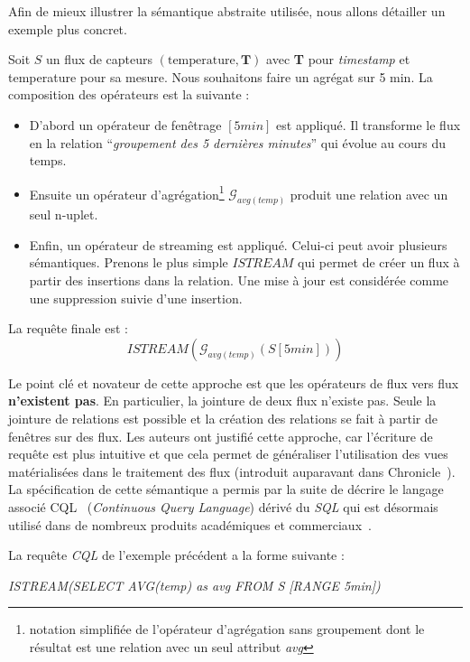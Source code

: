 Afin de mieux illustrer la sémantique abstraite utilisée, nous allons détailler un exemple plus concret.
\begin{example}
Soit $S$ un flux de capteurs $(\mathrm{temperature}, \textbf{T})$ avec \textbf{T} pour \textit{timestamp} et temperature pour sa mesure. Nous souhaitons faire un agrégat sur 5 min. La composition des opérateurs est la suivante :
\begin{itemize}
\item D'abord un opérateur de fenêtrage $[5min]$ est appliqué. Il transforme le flux en la relation \enquote{\it groupement des 5 dernières minutes} qui évolue au cours du temps.
\item Ensuite un opérateur d'agrégation\footnote{notation simplifiée de l'opérateur d'agrégation sans groupement dont le résultat est une relation avec un seul attribut \textit{avg}} $\mathcal G_{avg(temp)}$ produit une relation avec un seul n-uplet.
\item Enfin, un opérateur de \textup{streaming} est appliqué. Celui-ci peut avoir plusieurs sémantiques. Prenons le plus simple $ISTREAM$ qui permet de créer un flux à partir des insertions dans la relation. Une mise à jour est considérée comme une suppression suivie d'une insertion.
\end{itemize}
La requête finale est : $$ISTREAM(\mathcal G_{avg(temp)}(S[5min]))$$
\end{example}

Le point clé et novateur de cette approche est que les opérateurs de flux vers flux \textbf{n'existent pas}. En particulier, la jointure de deux flux n'existe pas. Seule la jointure de relations est possible et la création des relations se fait à partir de fenêtres sur des flux. Les auteurs ont justifié cette approche, car l'écriture de requête est plus intuitive et que cela permet de généraliser l'utilisation des vues matérialisées dans le traitement des flux (introduit auparavant dans Chronicle~\cite{Jagadish:chronicle}). La spécification de cette sémantique a permis par la suite de décrire le langage associé CQL~\cite{Arasu:cql} (\textit{Continuous Query Language}) dérivé du \textit{SQL} qui est désormais utilisé dans de nombreux produits académiques et commerciaux~\cite{Witkowski:oraclecq,url:sqlstream}.

\begin{example}
La requête \textit{CQL} de l'exemple précédent a la forme suivante : 
\begin{center}
\it ISTREAM(SELECT AVG(temp) as avg FROM S [RANGE 5min])
\end{center}
\end{example}

